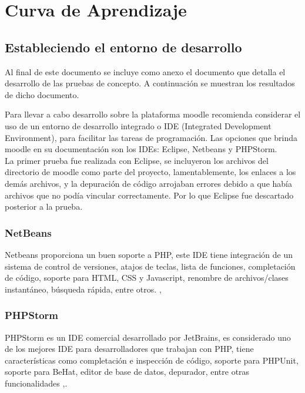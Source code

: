 \chapter{Curva de Aprendizaje}
\label{ch:curvaAprendizaje}

\section{Estableciendo el entorno de desarrollo}

 Al final de este documento se incluye como anexo el documento que detalla el desarrollo de las pruebas de concepto. A continuación se muestran los resultados de dicho documento.

Para llevar a cabo desarrollo sobre la plataforma moodle recomienda considerar el uso de un entorno de desarrollo integrado o IDE (Integrated Development Environment), para facilitar las tareas de programación. Las opciones que brinda moodle en su documentación son los IDEs: Eclipse, Netbeans y PHPStorm.\\

\noindent La primer prueba fue realizada con Eclipse, se incluyeron los archivos del directorio de moodle como parte del proyecto, lamentablemente, los enlaces a los demás archivos, y la depuración de código arrojaban errores debido a que había archivos que no podía vincular correctamente. Por lo que Eclipse fue descartado posterior a la prueba.

\subsection{NetBeans}

Netbeans proporciona un buen soporte a PHP, este IDE tiene integración de un sistema de control de versiones, atajos de teclas, lista de funciones, completación de código, soporte para HTML, CSS y Javascript, renombre de archivos/clases instantáneo, búsqueda rápida, entre otros. \cite{NetBeans}, \cite{moodleNetbeans}


\subsection{PHPStorm}

PHPStorm es un IDE comercial desarrollado por JetBrains, es considerado uno de los mejores IDE para desarrolladores que trabajan con PHP, tiene características como completación e inspección de código, soporte para PHPUnit, soporte para BeHat, editor de base de datos, depurador, entre otras funcionalidades \cite{PHPStorm},\cite{  moodlePHPStorm}.

